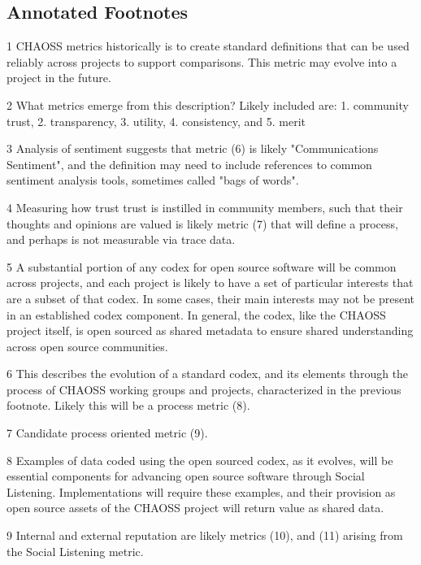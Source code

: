 \hypertarget{annotated-footnotes}{%
\subsection{Annotated Footnotes}\label{annotated-footnotes}}

1 CHAOSS metrics historically is to create standard definitions that can
be used reliably across projects to support comparisons. This metric may
evolve into a project in the future.

2 What metrics emerge from this description? Likely included are: 1.
community trust, 2. transparency, 3. utility, 4. consistency, and 5.
merit

3 Analysis of sentiment suggests that metric (6) is likely
"Communications Sentiment", and the definition may need to include
references to common sentiment analysis tools, sometimes called "bags of
words".

4 Measuring how trust trust is instilled in community members, such that
their thoughts and opinions are valued is likely metric (7) that will
define a process, and perhaps is not measurable via trace data.

5 A substantial portion of any codex for open source software will be
common across projects, and each project is likely to have a set of
particular interests that are a subset of that codex. In some cases,
their main interests may not be present in an established codex
component. In general, the codex, like the CHAOSS project itself, is
open sourced as shared metadata to ensure shared understanding across
open source communities.

6 This describes the evolution of a standard codex, and its elements
through the process of CHAOSS working groups and projects, characterized
in the previous footnote. Likely this will be a process metric (8).

7 Candidate process oriented metric (9).

8 Examples of data coded using the open sourced codex, as it evolves,
will be essential components for advancing open source software through
Social Listening. Implementations will require these examples, and their
provision as open source assets of the CHAOSS project will return value
as shared data.

9 Internal and external reputation are likely metrics (10), and (11)
arising from the Social Listening metric.
